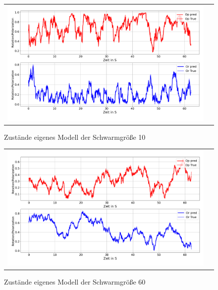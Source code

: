 \begin{appendices}
\begin{figure}[H]
\centering
\begin{tabular}{cc}
\includegraphics[width=1.0\textwidth]{figures/Anhang/PWD_10.png} 
\end{tabular}
\caption{Zustände eigenes Modell der Schwarmgröße 10 }
\end{figure}

\begin{figure}[H]
\centering
\begin{tabular}{cc}
\includegraphics[width=1.0\textwidth]{figures/Anhang/PWD_60.png} 
\end{tabular}
\caption{Zustände eigenes Modell der Schwarmgröße 60 }
\end{figure}

\end{appendices}